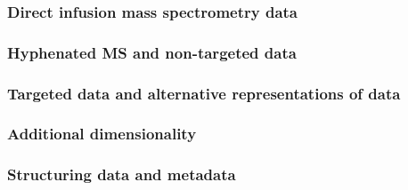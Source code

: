 \documentclass[]{article}
\begin{document}
\hypertarget{direct-infusion-mass-spectrometry-data}{%
\subsubsection{Direct infusion mass spectrometry data}\label{direct-infusion-mass-spectrometry-data}}

\hypertarget{hyphenated-ms-and-non-targeted-data}{%
\subsubsection{Hyphenated MS and non-targeted data}\label{hyphenated-ms-and-non-targeted-data}}

\hypertarget{targeted-data-and-alternative-representations-of-data}{%
\subsubsection{Targeted data and alternative representations of data}\label{targeted-data-and-alternative-representations-of-data}}

\hypertarget{additional-dimensionality}{%
\subsubsection{Additional dimensionality}\label{additional-dimensionality}}

\hypertarget{structuring-data-and-metadata}{%
\subsubsection{Structuring data and metadata}\label{structuring-data-and-metadata}}
\end{document}
